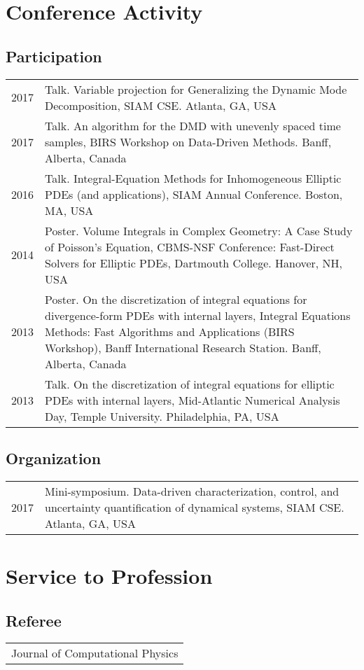 \section{Conference Activity}

\subsection{Participation}

\begin{tabular}{p{2cm}p{15cm}}
2017 & Talk. Variable projection for Generalizing the Dynamic
Mode Decomposition, SIAM CSE. Atlanta, GA, USA \\
2017 & Talk. An algorithm for the DMD with unevenly spaced
time samples, BIRS Workshop on Data-Driven Methods. Banff, 
Alberta, Canada \\
2016 & Talk. Integral-Equation Methods for Inhomogeneous 
Elliptic PDEs (and applications), SIAM Annual Conference. 
Boston, MA, USA \\
2014 & Poster. Volume Integrals in Complex Geometry: A 
Case Study of Poisson's Equation, CBMS-NSF Conference: Fast-Direct
Solvers for Elliptic PDEs, Dartmouth College. Hanover, NH, USA \\
2013 & Poster. On the discretization of integral equations for 
divergence-form PDEs with internal layers, Integral Equations Methods:
Fast Algorithms and Applications (BIRS Workshop), Banff International
Research Station. Banff, Alberta, Canada \\
2013 & Talk. On the discretization of integral equations for 
elliptic PDEs with internal layers,
Mid-Atlantic Numerical Analysis Day, Temple University. Philadelphia, PA,
USA
\end{tabular}

\subsection{Organization}

\begin{tabular}{p{2cm}p{15cm}}
2017 & Mini-symposium. Data-driven characterization, control, 
and uncertainty quantification of dynamical systems, SIAM CSE. Atlanta,
GA, USA
\end{tabular}


\section{Service to Profession}

\subsection{Referee}
\begin{tabular}{p{17cm}}
Journal of Computational Physics
\end{tabular}

